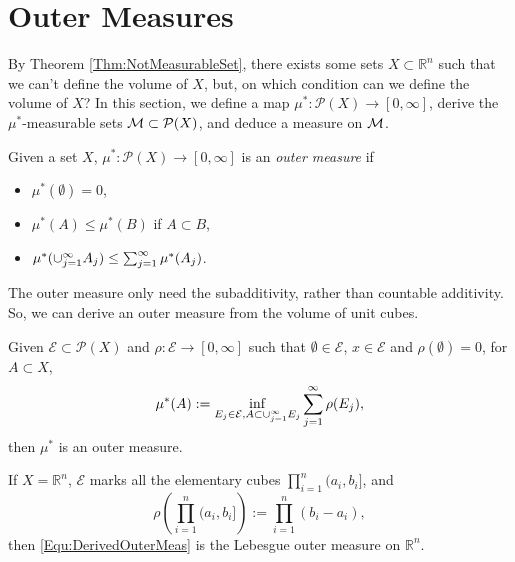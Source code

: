 \section{Outer Measures}
\begin{rem}
    By Theorem \ref{Thm:NotMeasurableSet}, there exists 
    some sets $X\subset\mathbb{R}^{n}$ such that we can't define the 
    volume of $X$, but, on which condition can we define the volume of $X$?
    In this section, we define a map 
    $\mu^{*}:\mathcal{P}(X)\rightarrow [0,\infty]$, derive the 
    $\mu^{*}$-measurable sets $\mathcal{M}\subset \mathcal{P}(X)$, and 
    deduce a measure on $\mathcal{M}$. 
\end{rem}
\begin{defn}
    Given a set $X$, $\mu^{*}:\mathcal{P}(X)\rightarrow[0,\infty]$ 
    is an \textit{outer measure} if 
    \begin{itemize}
        \item $\mu^{*}(\emptyset)=0$,
        \item $\mu^{*}(A)\le\mu^{*}(B)$ if $A\subset B$, 
        \item $\mu^{*}(\cup_{j=1}^{\infty}A_{j})\le\sum_{j=1}^{\infty}\mu^{*}(A_{j})$.
    \end{itemize}
\end{defn}
\begin{rem}
    The outer measure only need 
    the subadditivity, rather than countable additivity. 
    So, we can derive an outer measure from the volume of unit cubes.
\end{rem}
\begin{prop}
    \label{Prop:OuterMeasureFromFunction}
    Given $\mathcal{E}\subset\mathcal{P}(X)$ and 
    $\rho:\mathcal{E}\rightarrow[0,\infty]$ such that 
    $\emptyset\in\mathcal{E}$, $x\in\mathcal{E}$ 
    and $\rho(\emptyset)=0$, for $A\subset X$, 
    \begin{equation}
        \label{Equ:DerivedOuterMeas}
        \mu^{*}(A):=\inf_{E_j\in\mathcal{E},A\subset\cup_{j=1}^{\infty}E_j}
        \sum_{j=1}^{\infty}\rho(E_j),
    \end{equation}
    then $\mu^{*}$ is an outer measure.
\end{prop}
\begin{rem}
    If $X=\mathbb{R}^{n}$, $\mathcal{E}$ marks all the 
    elementary cubes $\prod_{i=1}^{n}(a_i,b_i]$, 
    and 
    \begin{displaymath}
        \rho\left(\prod_{i=1}^{n}(a_i,b_i]\right)
        :=\prod_{i=1}^{n}(b_i-a_i),
    \end{displaymath}
    then 
    \eqref{Equ:DerivedOuterMeas} is the Lebesgue outer measure 
    on $\mathbb{R}^{n}$.
\end{rem}
